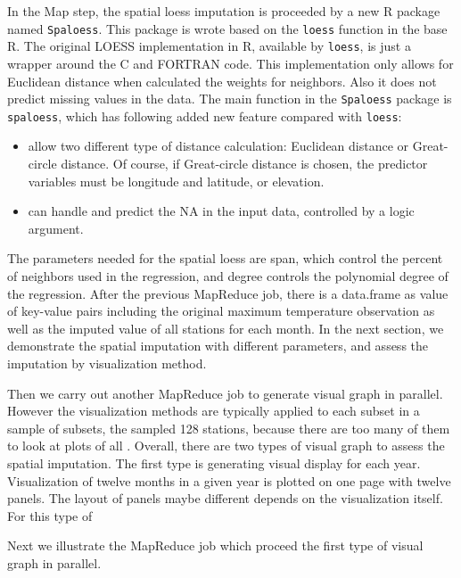 In the Map step, the spatial loess imputation is proceeded by a new R package 
named \texttt{Spaloess}. This package is wrote based on the \texttt{loess} function
in the base R. The original LOESS implementation in R, available by \texttt{loess},
is just a wrapper around the C and FORTRAN code. This implementation only allows
for Euclidean distance when calculated the weights for neighbors. Also it does
not predict missing values in the data. The main function in the \texttt{Spaloess} 
package is \texttt{spaloess}, which has following added new feature compared with 
\texttt{loess}:
\begin{itemize}
  \item allow two different type of distance calculation: Euclidean distance or
  Great-circle distance. Of course, if Great-circle distance is chosen, the 
  predictor variables must be longitude and latitude, or elevation.
  \item can handle and predict the NA in the input data, controlled by a logic
  argument.
\end{itemize}

The parameters needed for the spatial loess are span, which control the percent
of neighbors used in the regression, and degree controls the polynomial degree of
the regression. 
After the previous MapReduce job, there is a data.frame as value of key-value 
pairs including the original maximum temperature observation as well as the 
imputed value of all stations for each month. In the next section, we demonstrate
the spatial imputation with different parameters, and assess the imputation by
visualization method.

Then we carry out another MapReduce job to generate visual graph in parallel. 
However the visualization methods are typically applied to each subset in a 
sample of subsets, the sampled 128 stations, because there are too many of them 
to look at plots of all \cite{Hafen:2013}.
Overall, there are two types of visual graph to assess the spatial imputation. The
first type is generating visual display for each year. Visualization of twelve
months in a given year is plotted on one page with twelve panels. The layout of
panels maybe different depends on the visualization itself. For this type of 

Next we illustrate the MapReduce job which proceed the first type of visual graph
in parallel.

